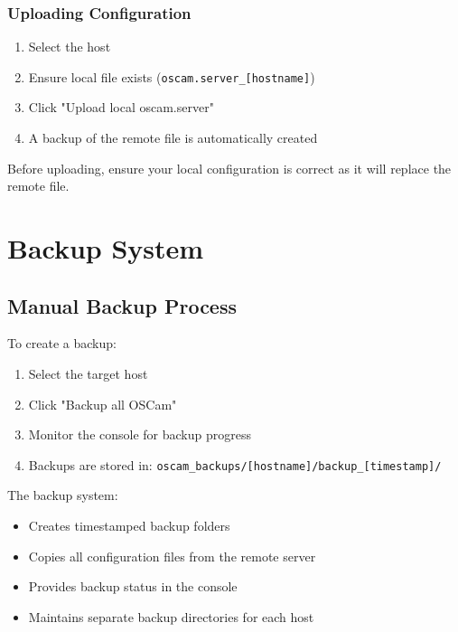 \documentclass[a4paper,11pt]{report}
\begin{document}
\subsection{Uploading Configuration}
\begin{procedurebox}
\begin{enumerate}
    \item Select the host
    \item Ensure local file exists (\texttt{oscam.server\_[hostname]})
    \item Click "Upload local oscam.server"
    \item A backup of the remote file is automatically created
\end{enumerate}
\end{procedurebox}

\begin{warningbox}
Before uploading, ensure your local configuration is correct as it will replace the remote file.
\end{warningbox}

\chapter{Backup System}

\section{Manual Backup Process}
\begin{procedurebox}
To create a backup:
\begin{enumerate}
    \item Select the target host
    \item Click "Backup all OSCam"
    \item Monitor the console for backup progress
    \item Backups are stored in: \texttt{oscam\_backups/[hostname]/backup\_[timestamp]/}
\end{enumerate}
\end{procedurebox}

\begin{notebox}
The backup system:
\begin{itemize}
    \item Creates timestamped backup folders
    \item Copies all configuration files from the remote server
    \item Provides backup status in the console
    \item Maintains separate backup directories for each host
\end{itemize}
\end{notebox}
\end{document}
